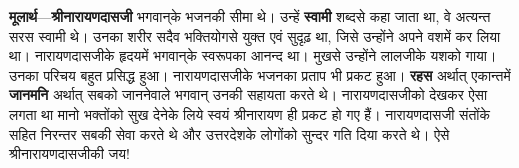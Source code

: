 \begin{sloppypar}\justifying{}
\textbf{मूलार्थ}—\textbf{श्रीनारायणदासजी} भगवान्‌के भजनकी सीमा थे। उन्हें \textbf{स्वामी} शब्दसे कहा जाता था, वे अत्यन्त सरस स्वामी थे। उनका शरीर सदैव भक्तियोगसे युक्त एवं सुदृढ़ था, जिसे उन्होंने अपने वशमें कर लिया था। नारायणदासजीके हृदयमें भगवान्‌के स्वरूपका आनन्द था। मुखसे उन्होंने लालजीके यशको गाया। उनका परिचय बहुत प्रसिद्ध हुआ। नारायणदासजीके भजनका प्रताप भी प्रकट हुआ। \textbf{रहस} अर्थात् एकान्तमें \textbf{जानमनि} अर्थात् सबको जाननेवाले भगवान् उनकी सहायता करते थे। नारायणदासजीको देखकर ऐसा लगता था मानो भक्तोंको सुख देनेके लिये स्वयं श्रीनारायण ही प्रकट हो गए हैं। नारायणदासजी संतोंके सहित निरन्तर सबकी सेवा करते थे और उत्तरदेशके लोगोंको सुन्दर गति दिया करते थे। ऐसे श्रीनारायणदासजीकी जय!
\end{sloppypar}


